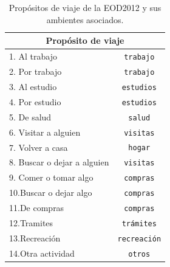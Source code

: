 \begin{table}[h!]
\centering
\begin{tabular}{||l|c||} 
 \hline
 \multicolumn{2}{||c||}{Propósito de viaje} \\
 \hline
1. Al trabajo               & \texttt{trabajo}      \\
2. Por trabajo              & \texttt{trabajo}      \\
3. Al estudio               & \texttt{estudios}     \\
4. Por estudio              & \texttt{estudios}     \\
5. De salud                 & \texttt{salud}        \\
6. Visitar a alguien        & \texttt{visitas}      \\
7. Volver a casa            & \texttt{hogar}        \\
8. Buscar o dejar a alguien & \texttt{visitas}      \\
9. Comer o tomar algo       & \texttt{compras}      \\
10.Buscar o dejar algo      & \texttt{compras}      \\
11.De compras               & \texttt{compras}      \\
12.Tramites                 & \texttt{trámites}     \\
13.Recreación               & \texttt{recreación}   \\
14.Otra actividad           & \texttt{otros}        \\
 \hline
\end{tabular}
\caption{Propósitos de viaje de la EOD2012 y sus ambientes asociados.}
\label{table:ambientes-prop-full}
\end{table}

